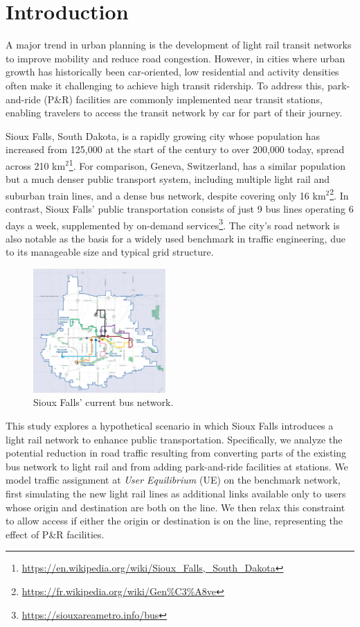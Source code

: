 \section{Introduction}

A major trend in urban planning is the development of light rail transit networks to improve mobility and reduce road congestion. However, in cities where urban growth has historically been car-oriented, low residential and activity densities often make it challenging to achieve high transit ridership. To address this, park-and-ride (P\&R) facilities are commonly implemented near transit stations, enabling travelers to access the transit network by car for part of their journey.

Sioux Falls, South Dakota, is a rapidly growing city whose population has increased from 125,000 at the start of the century to over 200,000 today, spread across 210 km$^2$\footnote{\url{https://en.wikipedia.org/wiki/Sioux_Falls,_South_Dakota}}. For comparison, Geneva, Switzerland, has a similar population but a much denser public transport system, including multiple light rail and suburban train lines, and a dense bus network, despite covering only 16 km$^2$\footnote{\url{https://fr.wikipedia.org/wiki/Gen\%C3\%A8ve}}. In contrast, Sioux Falls' public transportation consists of just 9 bus lines operating 6 days a week, supplemented by on-demand services\footnote{\url{https://siouxareametro.info/bus}}. The city’s road network is also notable as the basis for a widely used benchmark in traffic engineering, due to its manageable size and typical grid structure.

\begin{figure}
    \centering
    \includegraphics[keepaspectratio,width=0.45\textwidth]{Figures/siouxfalls_bus_network.png}
    \caption{Sioux Falls' current bus network.}
    \label{fig:sioux_falls_bus_network}
\end{figure}

This study explores a hypothetical scenario in which Sioux Falls introduces a light rail network to enhance public transportation. Specifically, we analyze the potential reduction in road traffic resulting from converting parts of the existing bus network to light rail and from adding park-and-ride facilities at stations. We model traffic assignment at \textit{User Equilibrium} (UE) on the benchmark network, first simulating the new light rail lines as additional links available only to users whose origin and destination are both on the line. We then relax this constraint to allow access if either the origin or destination is on the line, representing the effect of P\&R facilities.

